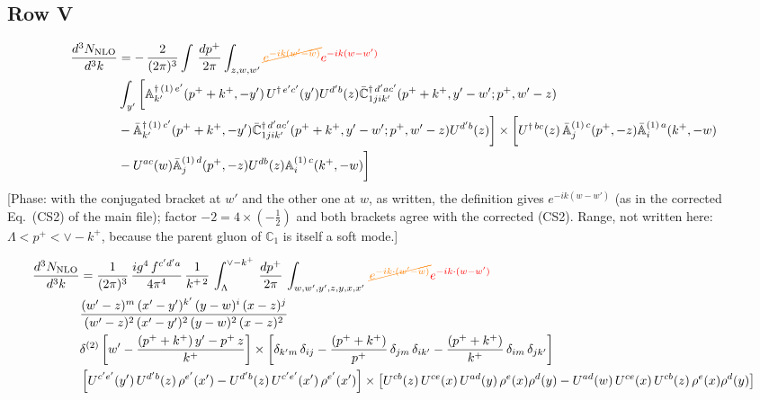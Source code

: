 \documentclass[9pt]{article}
\def\mf#1{\mathbb{#1}}
\numberwithin{equation}{section}
\begin{document}
\subsection{Row V\,}
\begin{align}
 \frac{d^{3}N_{\rm NLO}}{d^{3}k} & =   -\,\frac{2}{(2\pi)^{3}} \int\, \frac{dp^{+}}{2\pi}\int_{z,w,w^{\prime}} {\color{orange}\cancel{e^{-ik(w^{\prime}-w)}}}{\color{red}e^{-ik(w-w^{\prime})}}\,\notag \\ & \int_{y^{\prime}}\bigg[\mf{A}^{\dagger\, (1)\,e^{\prime}}_{k^{\prime}}(p^{+}+k^{+},-y^{\prime})\,U^{\dagger\, e^{\prime}c^{\prime}}(y^{\prime})U^{d^{\prime}b}(z) \Bar{\mf{C}}^{\dagger\, d^{\prime}ac^{\prime}}_{1jik^{\prime}}(p^{+}+k^{+},y^{\prime}-w^{\prime}; p^{+},w^{\prime}-z) \notag \\ & -\Bar{\mf{A}}^{\dagger\, (1)\,c^{\prime}}_{k^{\prime}}(p^{+}+k^{+},-y^{\prime}) \Bar{\mf{C}}^{\dagger\, d^{\prime}ac^{\prime}}_{1jik^{\prime}}(p^{+}+k^{+},y^{\prime}-w^{\prime}; p^{+},w^{\prime}-z)U^{d^{\prime}b}(z)\bigg] \times  \bigg[U^{\dagger\,bc}(z)\,\Bar{\mf{A}}^{(1)\, c}_{j}(p^{+},-z)\Bar{\mf{A}}^{(1)\, a}_{i}(k^{+},-w)\notag \\ & -U^{ac}(w) \Bar{\mf{A}}^{(1)\, d}_{j}(p^{+},-z)U^{db}(z) \mf{A}^{(1)\, c}_{i}(k^{+},- w)\bigg]\nonumber
\end{align} {\color{red}[Phase: with the conjugated bracket at $w'$ and the other one at $w$, as written, the definition gives $e^{-ik(w-w')}$ (as in the corrected Eq.~(CS2) of the main file); factor $-2=4\times(-\frac12)$ and both brackets agree with the corrected (CS2). Range, not written here: $\Lambda<p^{+}<\vee-k^{+}$, because the parent gluon of $\mf{C}_1$ is itself a soft mode.]}\par\noindent 
\begin{align}
     \frac{d^{3}N_{\rm NLO}}{d^{3}k} & = \frac{1}{(2\pi)^{3}}\,\frac{ig^{4}\,f^{c'd'a}}{4\pi^{4}}\, \frac{1}{k^{+\,2}}\,\int_{\Lambda}^{\vee-k^{+}}\, \frac{dp^{+}}{2\pi}\, \int_{w,w',y',z,y,x,x'}\, {\color{orange}\cancel{e^{-ik\cdot (w'-w)}}}{\color{red}e^{-ik\cdot (w-w')}}\, \notag \\ & \frac{(w'-z)^{m}\,(x'-y')^{k'}\,(y-w)^{i}\,(x-z)^{j}}{(w'-z)^{2}\,(x'-y')^{2}\,(y-w)^{2}\,(x-z)^{2}}\notag \\ & \delta^{(2)}\left[w'-\frac{(p^{+}+k^{+})\,y'-p^{+}\,z}{k^{+}}\right]\times \left[\delta_{k'm}\,\delta_{ij}-\frac{(p^{+}+k^{+})}{p^{+}}\,\delta_{jm}\,\delta_{ik'}-\frac{(p^{+}+k^{+})}{k^{+}}\, \delta_{im}\, \delta_{jk'}\right]\notag \\ & \left[U^{c'e'}(y')\,U^{d'b}(z)\,\rho^{e'}(x')-U^{d'b}(z)\,U^{c'e'}(x')\,\rho^{e'}(x')\right]\times \left[U^{cb}(z)\,U^{ce}(x)\,U^{ad}(y)\,\rho^{e}(x)\rho^{d}(y)-U^{ad}(w)\,U^{ce}(x)\,U^{cb}(z)\,\rho^{e}(x)\rho^{d}(y)\right]
\end{align}
\end{document}
